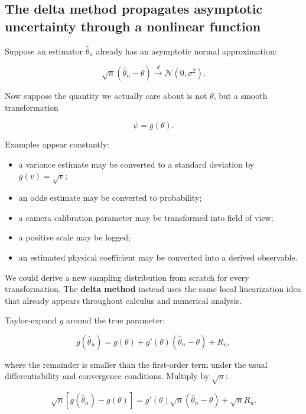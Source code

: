 \subsection{The delta method propagates asymptotic uncertainty through a nonlinear function}\label{02-foundations-ii-ch030-the-delta-method-propagates-asymptotic-uncertainty-through-a-nonlinear-function}

\hypertarget{02-foundations-ii-ch030-the-delta-method-propagates-asymptotic-uncertainty-through-a-nonlinear-function}{}

Suppose an estimator \(\widehat\theta_n\) already has an asymptotic normal approximation:

\[
\sqrt n(\widehat\theta_n-\theta)
\xrightarrow{d}
\mathcal N(0,\sigma^2).
\]

Now suppose the quantity we actually care about is not \(\theta\), but a smooth transformation

\[
\psi=g(\theta).
\]

Examples appear constantly:

\begin{itemize}
\tightlist
\item
  a variance estimate may be converted to a standard deviation by \(g(v)=\sqrt v\);
\item
  an odds estimate may be converted to probability;
\item
  a camera calibration parameter may be transformed into field of view;
\item
  a positive scale may be logged;
\item
  an estimated physical coefficient may be converted into a derived observable.
\end{itemize}

We could derive a new sampling distribution from scratch for every transformation. The \textbf{delta method} instead uses the same local linearization idea that already appears throughout calculus and numerical analysis.

Taylor-expand \(g\) around the true parameter:

\[
g(\widehat\theta_n)
=
g(\theta)
+
g'(\theta)(\widehat\theta_n-\theta)
+
R_n,
\]

where the remainder is smaller than the first-order term under the usual differentiability and convergence conditions. Multiply by \(\sqrt n\):

\[
\sqrt n
\left[
g(\widehat\theta_n)-g(\theta)
\right]
=
g'(\theta)
\sqrt n(\widehat\theta_n-\theta)
+
\sqrt nR_n.
\]

